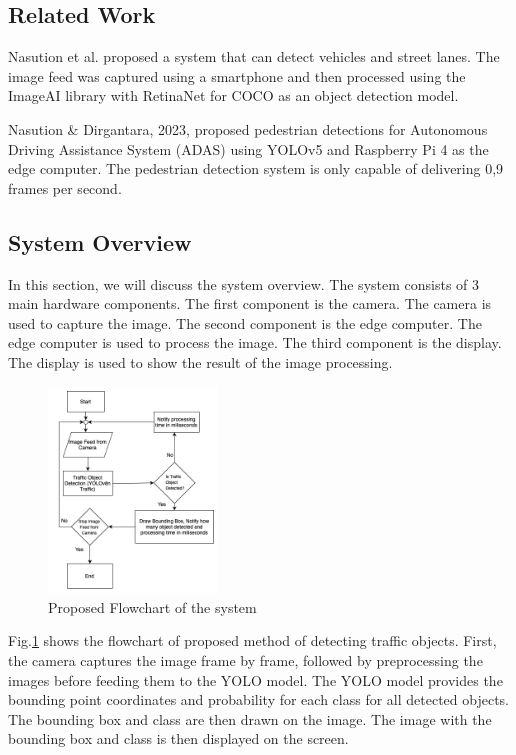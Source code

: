 \documentclass[conference]{IEEEtran}
\begin{document}
\subsection{Related Work}
Nasution et al.\cite{nasution2020road} proposed a system that can detect vehicles and street lanes. The image feed was captured using a smartphone and then processed using the ImageAI library with RetinaNet for COCO as an object detection model.


Nasution \& Dirgantara, 2023, proposed pedestrian detections for Autonomous Driving Assistance System (ADAS) using YOLOv5 and Raspberry Pi 4 as the edge computer. The pedestrian detection system is only capable of delivering 0,9 frames per second\cite{nasution2023pedestrian}.

\subsection{System Overview}
In this section, we will discuss the system overview. The system consists of 3 main hardware components. 
The first component is the camera. The camera is used to capture the image.
The second component is the edge computer. The edge computer is used to process the image. 
The third component is the display. The display is used to show the result of the image processing.
\begin{figure}[!ht]
\centering
\includegraphics[width=0.4\textwidth,keepaspectratio]{Proposed Flowchart.png}
\caption{Proposed Flowchart of the system}
\label{fig:flowchart}
\end{figure}


Fig.\ref{fig:flowchart} shows the flowchart of proposed method of detecting traffic objects. First, the camera captures the image frame by frame, followed by preprocessing the images before feeding them to the YOLO model. The YOLO model provides the bounding point coordinates and probability for each class for all detected objects. The bounding box and class are then drawn on the image. The image with the bounding box and class is then displayed on the screen.
\end{document}
